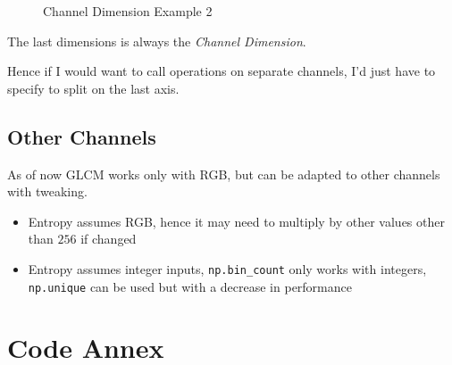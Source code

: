 \documentclass[article,oneside]{memoir}
\begin{document}
\begin{figure}[H]
\centering
{}
\caption{Channel Dimension Example 2 }
\label{Channel Dimension Example 2}
\end{figure}

The last dimensions is always the \textit{Channel Dimension}.

Hence if I would want to call operations on separate channels, I'd just have to specify to split on the last axis.





\section{Other Channels}

As of now GLCM works only with RGB, but can be adapted to other channels with tweaking.

\begin{itemize}
\item{Entropy assumes RGB, hence it may need to multiply by other values other than $256$ if changed}
\item{Entropy assumes integer inputs, \verb+np.bin_count+ only works with integers, \verb+np.unique+ can be used but with a decrease in performance}
\end{itemize}

\newpage
\chapter{Code Annex}
\end{document}
